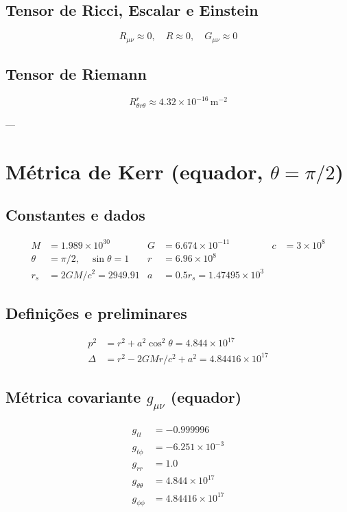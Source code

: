 \documentclass[12pt,a4paper]{article}
\begin{document}
\subsection*{Tensor de Ricci, Escalar e Einstein}
\[
R_{\mu\nu} \approx 0, \quad R \approx 0, \quad G_{\mu\nu} \approx 0
\]

\subsection*{Tensor de Riemann}
\[
R^r_{\theta r \theta} \approx 4.32\times10^{-16} \, \text{m}^{-2}
\]

---

\section{Métrica de Kerr (equador, $\theta = \pi/2$)}

\subsection*{Constantes e dados}
\begin{align*}
M &= 1.989\times10^{30} & G &= 6.674\times10^{-11} & c &= 3\times10^8\\
\theta &= \pi/2, \quad \sin\theta = 1 & r &= 6.96\times10^8\\
r_s &= 2GM/c^2 = 2949.91 & a &= 0.5 r_s = 1.47495\times10^3
\end{align*}

\subsection*{Definições e preliminares}
\begin{align*}
p^2 &= r^2 + a^2 \cos^2\theta = 4.844\times10^{17}\\
\Delta &= r^2 - 2 G M r/c^2 + a^2 = 4.84416\times10^{17}
\end{align*}

\subsection*{Métrica covariante $g_{\mu\nu}$ (equador)}
\begin{align*}
g_{tt} &= -0.999996\\
g_{t\phi} &= -6.251\times10^{-3}\\
g_{rr} &= 1.0\\
g_{\theta\theta} &= 4.844\times10^{17}\\
g_{\phi\phi} &= 4.84416\times10^{17}
\end{align*}
\end{document}
